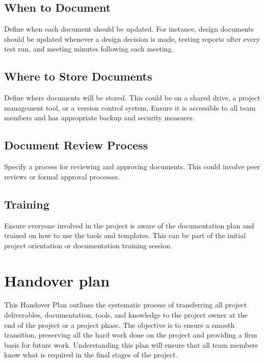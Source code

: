 \documentclass[10pt]{projectdoc}
\begin{document}
\subsection{When to Document}

Define when each document should be updated. For instance, design documents should be updated whenever a design decision is made, testing reports after every test run, and meeting minutes following each meeting.



\subsection{Where to Store Documents}

Define where documents will be stored. This could be on a shared drive, a project management tool, or a version control system. Ensure it is accessible to all team members and has appropriate backup and security measures.

\subsection{Document Review Process}

Specify a process for reviewing and approving documents. This could involve peer reviews or formal approval processes.

\subsection{Training}

Ensure everyone involved in the project is aware of the documentation plan and trained on how to use the tools and templates. This can be part of the initial project orientation or documentation training session.


\section{Handover plan}

\noindent This Handover Plan outlines the systematic process of transferring all project deliverables, documentation, tools, and knowledge to the project owner at the end of the project or a project phase. The objective is to ensure a smooth transition, preserving all the hard work done on the project and providing a firm basis for future work. Understanding this plan will ensure that all team members know what is required in the final stages of the project.
\end{document}
